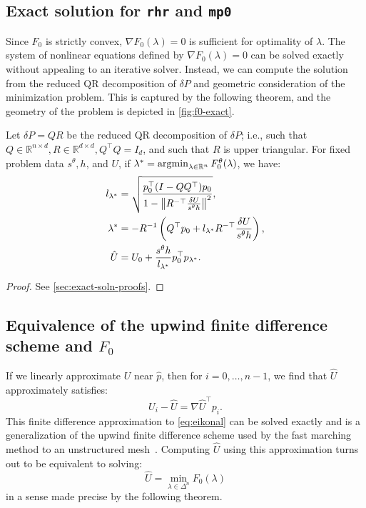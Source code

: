 \documentclass[sisc-eikonal.tex]{subfiles}
\begin{document}
\subsection{Exact solution for \texttt{rhr} and \texttt{mp0}}\label{ssec:exact-soln}

Since $F_0$ is strictly convex, $\nabla F_0(\lambda) = 0$ is
sufficient for optimality of $\lambda$. The system of nonlinear
equations defined by $\nabla F_0(\lambda) = 0$ can be solved exactly
without appealing to an iterative solver. Instead, we can compute the
solution from the reduced QR decomposition of $\delta P$ and geometric
consideration of the minimization problem. This is captured by the
following theorem, and the geometry of the problem is depicted in
\cref{fig:f0-exact}.

\begin{theorem}\label{thm:f0-exact}
  Let $\delta P = QR$ be the reduced QR decomposition of $\delta P$;
  i.e., such that
  $Q \in \mathbb{R}^{n \times d}, R \in \mathbb{R}^{d \times d},
  Q^\top Q = I_d$, and such that $R$ is upper triangular. For fixed
  problem data $s^\theta, h$, and $U$, if
  $\lambda^* = \operatorname{argmin}_{\lambda \in \mathbb{R}^n}
  F_0^\theta(\lambda)$, we have:
  \begin{align}
    l_{\lambda^*} &= \sqrt{\frac{p_0^\top {(I - QQ^\top)} p_0}{1 - \norm{R^{-\top} \frac{\delta U}{s^\theta h}}^2}},\label{eq:l-star-expression} \\
    \lambda^* &= -R^{-1} \parens{Q^\top p_0 + l_{\lambda^*} R^{-\top} \frac{\delta U}{s^\theta h}},\label{eq:f0-exact-lambda} \\ 
    \hat{U} &= U_0 + \frac{s^\theta h}{l_{\lambda^*}} p_0^\top p_{\lambda^*}.\label{eq:f0-exact}
  \end{align}
\end{theorem}

\begin{proof}
  See \cref{sec:exact-soln-proofs}.
\end{proof}

\subsection{Equivalence of the upwind finite difference scheme and
  $F_0$}\label{ssec:equivalence}

If we linearly approximate $U$ near $\hat{p}$, then for
$i = 0, \hdots, n - 1$, we find that $\hat{U}$ approximately
satisfies:
\begin{equation}
  \label{eq:finite-differences}
  U_i - \hat{U} = \nabla \hat{U}^\top p_i.
\end{equation}
This finite difference approximation to \cref{eq:eikonal} can be
solved exactly and is a generalization of the upwind finite difference
scheme used by the fast marching method to an unstructured
mesh~\cite{kimmel1998computing,sethian2000fast}. Computing $\hat{U}$
using this approximation turns out to be equivalent to solving:
\begin{equation}
  \hat{U} = \min_{\lambda \in \Delta^n} F_0(\lambda)
\end{equation}
in a sense made precise by the following theorem.
\end{document}
